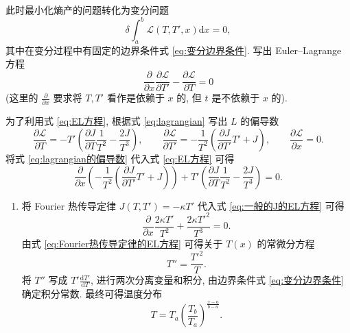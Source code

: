 \documentclass{article}
\begin{document}
\begin{enumerate}
此时最小化熵产的问题转化为变分问题
\begin{equation}
	\delta\int_a^b\mathcal L\left(T,T',x\right)\mathrm dx=0,
\end{equation}
其中在变分过程中有固定的边界条件式 \ref{eq:变分边界条件}.
写出 Euler--Lagrange 方程
\begin{equation}
	\frac{\partial}{\partial x}\frac{\partial\mathcal L}{\partial T'}-\frac{\partial\mathcal L}{\partial T}=0
	\label{eq:EL方程}
\end{equation}
(这里的 $\frac{\partial}{\partial x}$ 要求将 $T,T'$ 看作是依赖于 $x$ 的, 但 $t$ 是不依赖于 $x$ 的).

为了利用式 \ref{eq:EL方程}, 根据式 \ref{eq:lagrangian} 写出 $L$ 的偏导数
\begin{equation}
	\frac{\partial\mathcal L}{\partial T}=-T'\left(\frac{\partial J}{\partial T}\frac1{T^2}-\frac{2J}{T^3}\right),
	\qquad\frac{\partial\mathcal L}{\partial T'}=-\frac{1}{T^2}\left(\frac{\partial J}{\partial T'}T'+J\right),
	\qquad\frac{\partial\mathcal L}{\partial x}=0.
	\label{eq:lagrangian的偏导数}
\end{equation}
将式 \ref{eq:lagrangian的偏导数} 代入式 \ref{eq:EL方程} 可得
\begin{equation}
	\frac{\partial}{\partial x}\left(-\frac{1}{T^2}\left(\frac{\partial J}{\partial T'}T'+J\right)\right)+T'\left(\frac{\partial J}{\partial T}\frac1{T^2}-\frac{2J}{T^3}\right)=0.
	\label{eq:一般的J的EL方程}
\end{equation}

\begin{enumerate}

	\item
	将 Fourier 热传导定律 $J\left(T,T'\right)=-\kappa T'$ 代入式 \ref{eq:一般的J的EL方程} 可得
	\begin{equation}
		\frac{\partial}{\partial x}\frac{2\kappa T'}{T^2}+\frac{2\kappa T'^2}{T^3}=0.
		\label{eq:Fourier热传导定律的EL方程}
	\end{equation}
	由式 \ref{eq:Fourier热传导定律的EL方程} 可得关于 $T\left(x\right)$ 的常微分方程
	\begin{equation}
		T''=\frac{T'^2}{T}.
	\end{equation}
	将 $T''$ 写成 $T'\frac{\mathrm dT'}{\mathrm dT}$, 进行两次分离变量和积分, 由边界条件式 \ref{eq:变分边界条件} 确定积分常数.
	最终可得温度分布
	\begin{equation}
		T=T_a\left(\frac{T_b}{T_a}\right)^{\frac{x-a}{b-a}}.
	\end{equation}


\end{enumerate}
\end{enumerate}
\end{document}
